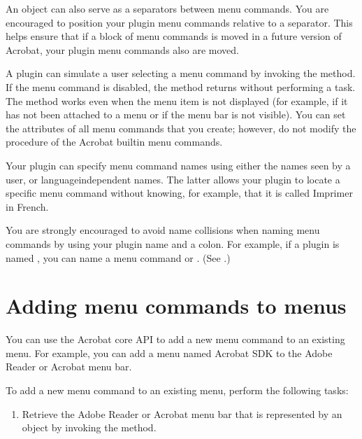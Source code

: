 \documentclass[letterpaper,12pt,english,openany,oneside]{sphinxmanual}
\begin{document}
An  object can also serve as a separators between menu commands. You are encouraged to position your plugin menu commands relative to a separator. This helps ensure that if a block of menu commands is moved in a future version of Acrobat, your plugin menu commands also are moved.

A plugin can simulate a user selecting a menu command by invoking the  method. If the menu command is disabled, the  method returns without performing a task. The  method works even when the menu item is not displayed (for example, if it has not been attached to a menu or if the menu bar is not visible). You can set the attributes of all menu commands that you create; however, do not modify the  procedure of the Acrobat built\sphinxhyphen{}in menu commands.

Your plugin can specify menu command names using either the names seen by a user, or language\sphinxhyphen{}independent names. The latter allows your plugin to locate a specific menu command without knowing, for example, that it is called Imprimer in French.

You are strongly encouraged to avoid name collisions when naming menu commands by using your plugin name and a colon. For example, if a plugin is named , you can name a menu command  or . (See .)


\section{Adding menu commands to menus}
\label{\detokenize{Plugins_Menu:adding-menu-commands-to-menus}}
You can use the Acrobat core API to add a new menu command to an existing menu. For example, you can add a menu named Acrobat SDK to the Adobe Reader or Acrobat menu bar.

To add a new menu command to an existing menu, perform the following tasks:
\begin{enumerate}
%
\item {} 
Retrieve the Adobe Reader or Acrobat menu bar that is represented by an  object by invoking the  method.

\end{enumerate}
\end{document}
